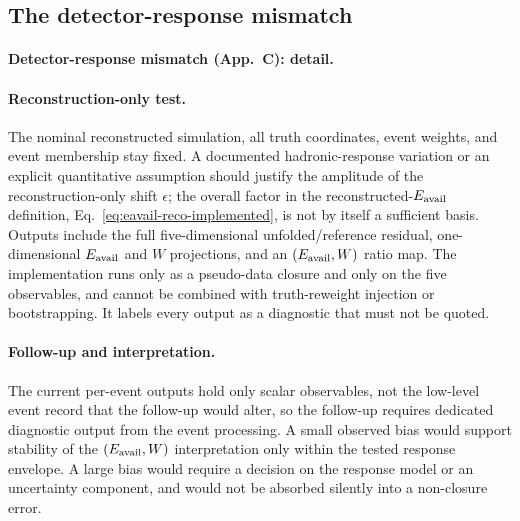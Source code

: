 \subsection{The detector-response mismatch}\label{recsec:supplementary-response}

\paragraph{Detector-response mismatch (App.~C): detail.}

\paragraph{Reconstruction-only test.} The nominal reconstructed simulation, all truth coordinates, event weights, and event membership stay fixed. A documented hadronic-response variation or an explicit quantitative assumption should justify the amplitude of the reconstruction-only shift $\epsilon$; the overall factor in the reconstructed-$E_{\mathrm{avail}}$ definition, Eq.~\eqref{eq:eavail-reco-implemented}, is not by itself a sufficient basis. Outputs include the full five-dimensional unfolded/reference residual, one-dimensional $E_{\mathrm{avail}}$ and $W$ projections, and an $(E_{\mathrm{avail}},W)$ ratio map. The implementation runs only as a pseudo-data closure and only on the five observables, and cannot be combined with truth-reweight injection or bootstrapping. It labels every output as a diagnostic that must not be quoted.

\paragraph{Follow-up and interpretation.} The current per-event outputs hold only scalar observables, not the low-level event record that the follow-up would alter, so the follow-up requires dedicated diagnostic output from the event processing. A small observed bias would support stability of the $(E_{\mathrm{avail}},W)$ interpretation only within the tested response envelope. A large bias would require a decision on the response model or an uncertainty component, and would not be absorbed silently into a non-closure error.


